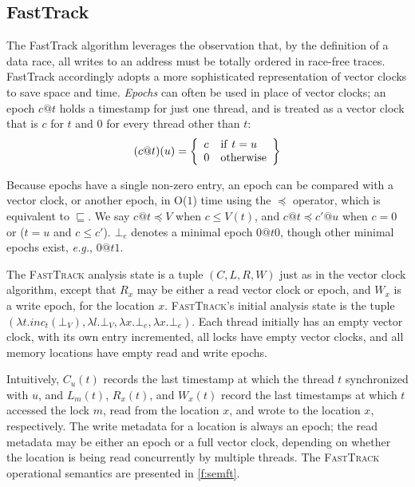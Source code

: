 \documentclass[preprint, 10pt]{sigplanconf}
\newcommand{\eg}{\textit{e.g.}\xspace}
\newcommand{\FT}{\textsc{FastTrack}\xspace}
\newcommand{\Constant}{O($1$)\xspace}
\newcommand{\VCCompare}{\sqsubseteq}
\newcommand{\EpochCompare}{\preceq}
\begin{document}
\subsection{FastTrack}


The FastTrack algorithm \cite{fasttrack} leverages the observation that, by the definition of a data race, all writes to an address must be totally ordered in race-free traces. FastTrack accordingly adopts a more sophisticated representation of vector clocks to save space and time.
\emph{Epochs} can often be used in place of vector clocks; an epoch $c@t$  holds a timestamp for just one thread, and is treated as a vector clock that is $c$ for $t$ and 0 for every thread other than $t$:
\[
(c@t)(u) = 
\left\{
  \begin{array}[c]{ll}
   c & \mathrm{if}\ t = u \\
   0 & \mathrm{otherwise}
  \end{array}
  \right\}
\]

Because epochs have a single non-zero entry, an epoch can be compared with a vector clock, or another epoch, in \Constant time using the $\EpochCompare$ operator, which is equivalent to $\VCCompare$. We say $c@t \EpochCompare V$ when $c \leq V(t)$, and $c@t \EpochCompare c'@u$ when $c = 0$ or ($t = u$ and $c \leq c'$).
$\bot_e$ denotes a minimal epoch $0@t0$, though other minimal epochs exist, \eg, $0@t1$.

The \FT analysis state is a tuple $(C, L, R, W)$ just as in the vector clock algorithm, except that $R_x$ may be either a read vector clock or epoch, and $W_x$ is a write epoch, for the location $x$. \FT's initial analysis state is the tuple $(\lambda t.inc_t(\bot_V), \lambda l.\bot_V , \lambda x. \bot_e, \lambda x. \bot_e)$. Each thread initially has an empty vector clock, with its own entry incremented, all locks have empty vector clocks, and all memory locations have empty read and write epochs. 

Intuitively, $C_u(t)$ records the last timestamp at which the thread $t$ synchronized with $u$, and $L_m(t)$, $R_x(t)$, and $W_x(t)$ record the last timestamps at which $t$ accessed the lock $m$, read from the location $x$, and wrote to the location $x$, respectively. The write metadata for a location is always an epoch; the read metadata may be either an epoch or a full vector clock, depending on whether the location is being read concurrently by multiple threads. The \FT operational semantics are presented in \autoref{f:semft}.
\end{document}
